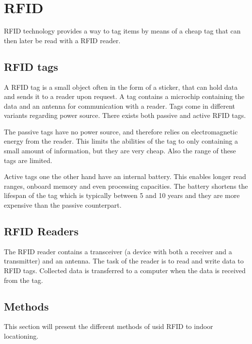 \section{RFID}
RFID technology provides a way to tag items by means of a cheap tag that can then later be read with a RFID reader.

\subsection{RFID tags} 
A RFID tag is a small object often in the form of a sticker, that can hold data and sends it to a reader upon request.
A tag contains a microchip containing the data and an antenna for communication with a reader.
Tags come in different variants regarding power source.
There exists both passive and active RFID tags.\cite{rfidreview}

The passive tags have no power source, and therefore relies on electromagnetic energy from the reader.
This limits the abilities of the tag to only containing a small amount of information, but they are very cheap.
Also the range of these tags are limited. \cite{rfidreview}

Active tags one the other hand have an internal battery.
This enables longer read ranges, onboard memory and even processing capacities.
The battery shortens the lifespan of the tag which is typically between 5 and 10 years and they are more expensive than the passive counterpart. \cite{rfidreview}

\subsection{RFID Readers}
The RFID reader contains a transceiver (a device with both a receiver and a transmitter) and an antenna.
The task of the reader is to read and write data to RFID tags.
Collected data is transferred to a computer when the data is received from the tag.\cite{rfidreview}

\subsection{Methods}
This section will present the different methods of usid RFID to indoor locationing.




